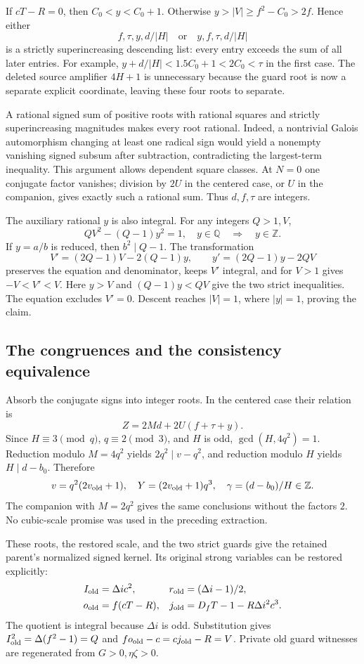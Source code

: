 If $cT-R=0$, then $C_0<y<C_0+1$. Otherwise
$y>|V|\ge f^2-C_0>2f$. Hence either
\[
 f,\tau,y,d/|H|\quad\text{or}\quad y,f,\tau,d/|H|
\]
is a strictly superincreasing descending list: every entry exceeds the
sum of all later entries. For example,
$y+d/|H|<1.5C_0+1<2C_0<\tau$ in the first case.
The deleted source amplifier $4H+1$ is unnecessary because the guard root
is now a separate explicit coordinate, leaving these four roots to separate.

A rational signed sum of positive roots with rational squares and strictly
superincreasing magnitudes makes every root rational. Indeed, a nontrivial
Galois automorphism changing at least one radical sign would yield a
nonempty vanishing signed subsum after subtraction, contradicting the
largest-term inequality. This argument allows dependent square classes.
At $N=0$ one conjugate factor vanishes; division by $2U$ in the centered
case, or $U$ in the companion, gives exactly such a rational sum.
Thus $d,f,\tau$ are integers.

The auxiliary rational $y$ is also integral. For any integers $Q>1,V$,
\[
 QV^2-(Q-1)y^2=1,\quad y\in\mathbb Q
 \quad\Longrightarrow\quad y\in\mathbb Z.
\]
If $y=a/b$ is reduced, then $b^2\mid Q-1$. The transformation
\[
 V'=(2Q-1)V-2(Q-1)y,\qquad
 y'=(2Q-1)y-2QV
\]
preserves the equation and denominator, keeps $V'$ integral, and for
$V>1$ gives $-V<V'<V$. Here $y>V$ and $(Q-1)y<QV$ give the two
strict inequalities. The equation excludes $V'=0$. Descent reaches
$|V|=1$, where $|y|=1$, proving the claim.

\subsection{The congruences and the consistency equivalence}

Absorb the conjugate signs into integer roots. In the centered case their
relation is
\[
 Z=2Md+2U(f+\tau+y).
\]
Since $H\equiv3\pmod q$, $q\equiv2\pmod3$, and $H$ is odd,
$\gcd(H,4q^2)=1$. Reduction modulo $M=4q^2$ yields
$2q^2\mid v-q^2$, and reduction modulo $H$ yields $H\mid d-b_0$.
Therefore
\[
 v=q^2(2v_{\rm old}+1),\quad
 Y=(2v_{\rm old}+1)q^3,\quad
 \gamma=(d-b_0)/H\in\mathbb Z.
\]
The companion with $M=2q^2$ gives the same conclusions without the
factors $2$. No cubic-scale promise was used in the preceding extraction.

These roots, the restored scale, and the two strict guards give the retained
parent's normalized signed kernel. Its original strong variables can be
restored explicitly:
\begin{align*}
 I_{\rm old}&=\Delta i c^2,& r_{\rm old}&=(\Delta i-1)/2,\\
 o_{\rm old}&=f(cT-R),&j_{\rm old}&=D_fT-1-R\Delta i^2c^3.
\end{align*}
The quotient is integral because $\Delta i$ is odd. Substitution gives
$I_{\rm old}^2=\Delta(f^2-1)=Q$ and
$fo_{\rm old}-c=cj_{\rm old}-R=V$. Private old guard witnesses are
regenerated from $G>0,\eta\zeta>0$.

